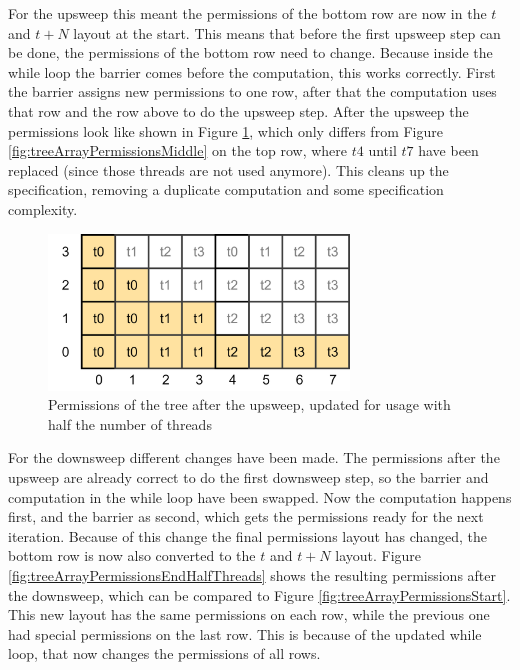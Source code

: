 \documentclass[a4paper]{article}
\begin{document}
For the upsweep this meant the permissions of the bottom row are now in the $t$ and $t+N$ layout at the start. This means that before the first upsweep step can be done, the permissions of the bottom row need to change. Because inside the while loop the barrier comes before the computation, this works correctly. First the barrier assigns new permissions to one row, after that the computation uses that row and the row above to do the upsweep step. After the upsweep the permissions look like shown in Figure \ref{fig:treeArrayPermissionsMiddleHalfThreads}, which only differs from Figure \ref{fig:treeArrayPermissionsMiddle} on the top row, where $t4$ until $t7$ have been replaced (since those threads are not used anymore). This cleans up the specification, removing a duplicate computation and some specification complexity.

\begin{figure}[htb!]
	\centering
	\includegraphics[width=80mm]{../images/tree-permissions-middle-halfthreads-v1.png}
	\caption{Permissions of the tree after the upsweep, updated for usage with half the number of threads}
	\label{fig:treeArrayPermissionsMiddleHalfThreads}
\end{figure}
\FloatBarrier

For the downsweep different changes have been made. The permissions after the upsweep are already correct to do the first downsweep step, so the barrier and computation in the while loop have been swapped. Now the computation happens first, and the barrier as second, which gets the permissions ready for the next iteration. Because of this change the final permissions layout has changed, the bottom row is now also converted to the $t$ and $t+N$ layout. Figure \ref{fig:treeArrayPermissionsEndHalfThreads} shows the resulting permissions after the downsweep, which can be compared to Figure \ref{fig:treeArrayPermissionsStart}. This new layout has the same permissions on each row, while the previous one had special permissions on the last row. This is because of the updated while loop, that now changes the permissions of all rows.
\end{document}
